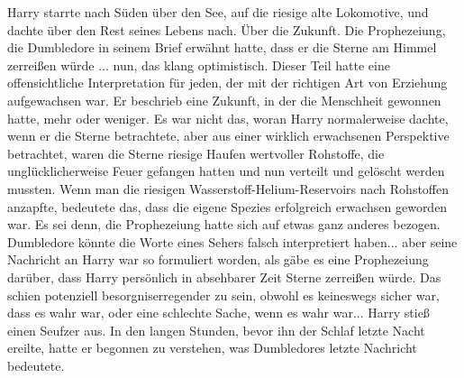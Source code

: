 Harry starrte nach Süden über den See, auf die riesige alte Lokomotive, und
dachte über den Rest seines Lebens nach. Über die Zukunft. Die Prophezeiung, die
Dumbledore in seinem Brief erwähnt hatte, dass er die Sterne am Himmel zerreißen
würde ... nun, das klang optimistisch. Dieser Teil hatte eine offensichtliche
Interpretation für jeden, der mit der richtigen Art von Erziehung aufgewachsen
war. Er beschrieb eine Zukunft, in der die Menschheit gewonnen hatte, mehr oder
weniger. Es war nicht das, woran Harry normalerweise dachte, wenn er die Sterne
betrachtete, aber aus einer wirklich erwachsenen Perspektive betrachtet, waren
die Sterne riesige Haufen wertvoller Rohstoffe, die unglücklicherweise Feuer
gefangen hatten und nun verteilt und gelöscht werden mussten. Wenn man die
riesigen Wasserstoff-Helium-Reservoirs nach Rohstoffen anzapfte, bedeutete das,
dass die eigene Spezies erfolgreich erwachsen geworden war. Es sei denn, die
Prophezeiung hatte sich auf etwas ganz anderes bezogen. Dumbledore könnte die
Worte eines Sehers falsch interpretiert haben... aber seine Nachricht an Harry
war so formuliert worden, als gäbe es eine Prophezeiung darüber, dass Harry
persönlich in absehbarer Zeit Sterne zerreißen würde. Das schien potenziell
besorgniserregender zu sein, obwohl es keineswegs sicher war, dass es wahr war,
oder eine schlechte Sache, wenn es wahr war... Harry stieß einen Seufzer aus. In
den langen Stunden, bevor ihn der Schlaf letzte Nacht ereilte, hatte er begonnen
zu verstehen, was Dumbledores letzte Nachricht bedeutete.

